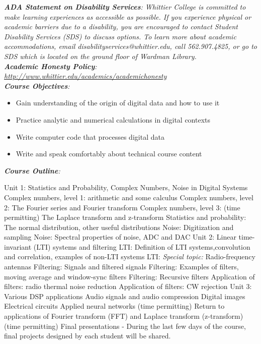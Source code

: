 \documentclass[10pt]{article}
\begin{document}
\textit{\textbf{ADA Statement on Disability Services}: Whittier College is committed to make learning experiences as accessible as possible.  If you experience physical or academic barriers due to a disability, you are encouraged to contact Student Disability Services (SDS) to discuss options.  To learn more about academic accommodations, email disabilityservices@whittier.edu, call 562.907.4825, or go to SDS which is located on the ground floor of Wardman Library.} \\
\textit{\textbf{Academic Honesty Policy}: \url{http://www.whittier.edu/academics/academichonesty}} \\
\textit{\textbf{Course Objectives}:}
\begin{itemize}
\item Gain understanding of the origin of digital data and how to use it
\item Practice analytic and numerical calculations in digital contexts
\item Write computer code that processes digital data
\item Write and speak comfortably about technical course content
\end{itemize}
\textit{\textbf{Course Outline}:}
\begin{outline}[enumerate]
\1 Unit 1: Statistics and Probability, Complex Numbers, Noise in Digital Systems
\2 Complex numbers, level 1: arithmetic and some calculus
\2 Complex numbers, level 2: The Fourier series and Fourier transform
\2 Complex numbers, level 3: (time permitting) The Laplace transform and z-transform
\2 Statistics and probability: The normal distribution, other useful distributions
\2 Noise: Digitization and sampling
\2 Noise: Spectral properties of noise, ADC and DAC
\1 Unit 2: Linear time-invariant (LTI) systems and filtering
\2 LTI: Definition of LTI systems,convolution and correlation, examples of non-LTI systems
\2 LTI: \textit{Special topic:} Radio-frequency antennas
\2 Filtering: Signals and filtered signals
\2 Filtering: Examples of filters, moving average and window-sync filters
\2 Filtering: Recursive filters
\2 Application of filters: radio thermal noise reduction
\2 Application of filters: CW rejection
\1 Unit 3: Various DSP applications
\2 Audio signals and audio compression
\2 Digital images
\2 Electrical circuits
\2 Applied neural networks (time permitting)
\2 Return to applications of Fourier transform (FFT) and Laplace transform (z-transform) (time permitting)
\1 Final presentations - During the last few days of the course, final projects designed by each student will be shared.
\end{outline}
\end{document}

